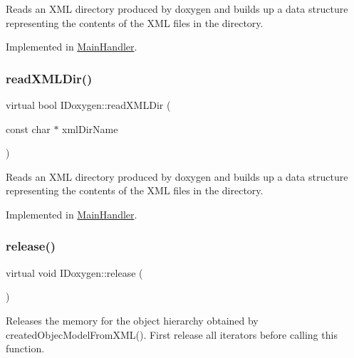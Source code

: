 Reads an X\+ML directory produced by doxygen and builds up a data structure representing the contents of the X\+ML files in the directory. 

Implemented in \mbox{\hyperlink{class_main_handler_a09e7e0c5e69be2b2aa5dc91cb77721d8}{Main\+Handler}}.

\mbox{\label{class_i_doxygen_a7959d93fba77caddee37b6d8370c10f0}} 
\subsubsection{\texorpdfstring{readXMLDir()}{readXMLDir()}\hspace{0.1cm}{\footnotesize\ttfamily [2/2]}}
{\footnotesize\ttfamily virtual bool I\+Doxygen\+::read\+X\+M\+L\+Dir (\begin{DoxyParamCaption}\item[{const char $\ast$}]{xml\+Dir\+Name }\end{DoxyParamCaption})\hspace{0.3cm}{\ttfamily [pure virtual]}}

Reads an X\+ML directory produced by doxygen and builds up a data structure representing the contents of the X\+ML files in the directory. 

Implemented in \mbox{\hyperlink{class_main_handler_a09e7e0c5e69be2b2aa5dc91cb77721d8}{Main\+Handler}}.

\mbox{\label{class_i_doxygen_a6865961012ad8e6c19b7575488046045}} 
\subsubsection{\texorpdfstring{release()}{release()}\hspace{0.1cm}{\footnotesize\ttfamily [1/2]}}
{\footnotesize\ttfamily virtual void I\+Doxygen\+::release (\begin{DoxyParamCaption}{ }\end{DoxyParamCaption})\hspace{0.3cm}{\ttfamily [pure virtual]}}

Releases the memory for the object hierarchy obtained by created\+Objec\+Model\+From\+X\+M\+L(). First release all iterators before calling this function. 

